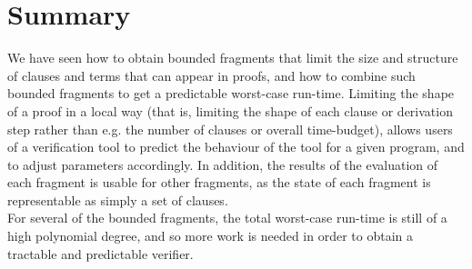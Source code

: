 \section{Summary}
We have seen how to obtain bounded fragments that limit the size and structure of clauses and terms that can appear in proofs, and how to combine such bounded fragments to get a predictable worst-case run-time. 
Limiting the shape of a proof in a local way (that is, limiting the shape of each clause or derivation step rather than e.g. the number of clauses or overall time-budget), allows users of a verification tool to predict the behaviour of the tool for a given program, and to adjust parameters accordingly. In addition, the results of the evaluation of each fragment is usable for other fragments, as the state of each fragment is representable as simply a set of clauses.\\
For several of the bounded fragments, the total worst-case run-time is still of a high polynomial degree, and so more work is needed in order to obtain a tractable and predictable verifier.
